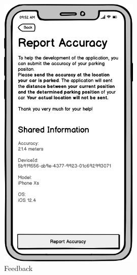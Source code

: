\begin{figure}[h]
  \centering
  \begin{minipage}[b]{0.49\textwidth}
    \centering
    \includegraphics[width=0.6\textwidth]{images/UI/Iteration4-Feedback.png}
    \caption{Feedback}
    \label{fig:feedback}
  \end{minipage}
  \hfill
  \begin{minipage}[b]{0.49\textwidth}
    \centering

\end{minipage}
\end{figure}
